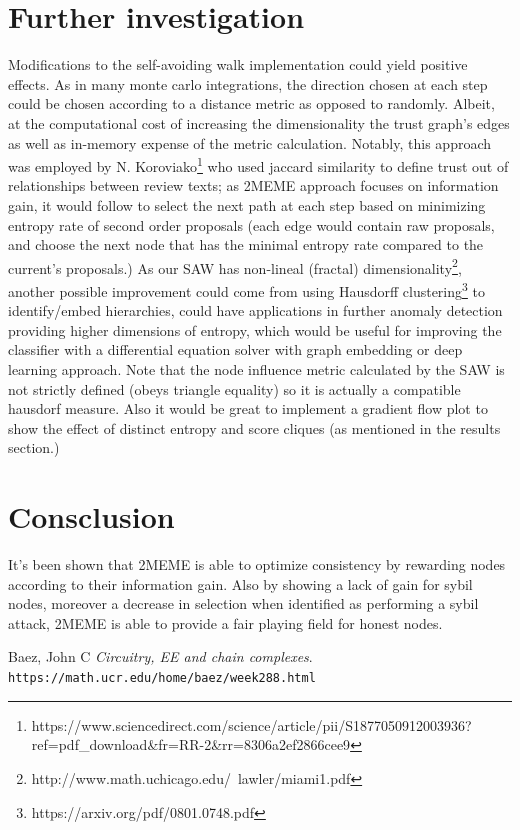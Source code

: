 \documentclass{article}
\begin{document}
\section{Further investigation}
	Modifications to the self-avoiding walk implementation could yield positive effects. As in many monte carlo integrations, the direction chosen at each step could be chosen according to a distance metric as opposed to randomly. Albeit, at the computational cost of increasing the dimensionality the trust graph’s edges as well as in-memory expense of the metric calculation. Notably, this approach was employed by N. Koroviako\footnote{https://www.sciencedirect.com/science/article/pii/S1877050912003936?ref=pdf_download&fr=RR-2&rr=8306a2ef2866cee9} who used jaccard similarity to define trust out of relationships between review texts; as 2MEME approach focuses on information gain, it would follow to select the next path at each step based on minimizing entropy rate of second order proposals (each edge would contain raw proposals, and choose the next node that has the minimal entropy rate compared to the current’s proposals.)
	As our SAW has non-lineal (fractal) dimensionality\footnote{http://www.math.uchicago.edu/~lawler/miami1.pdf}, another possible improvement could come from using Hausdorff clustering\footnote{https://arxiv.org/pdf/0801.0748.pdf} to identify/embed hierarchies, could have applications in further anomaly detection providing higher dimensions of entropy, which would be useful for improving the classifier with a differential equation solver with graph embedding or deep learning approach. Note that the node influence metric calculated by the SAW is not strictly defined (obeys triangle equality) so it is actually a compatible hausdorf measure. 
	Also it would be great to implement a gradient flow plot to show the effect of distinct entropy and score cliques (as mentioned in the results section.)
	
\section{Consclusion}
It's been shown that 2MEME is able to optimize consistency by rewarding nodes according to their information gain. Also by showing a lack of gain for sybil nodes, moreover a decrease in selection when identified as performing a sybil attack, 2MEME is able to provide a fair playing field for honest nodes.
	
	




\begin{thebibliography}{9}
Baez, John C
\textit{Circuitry, EE and chain complexes}.
\\\texttt{https://math.ucr.edu/home/baez/week288.html}

\end{thebibliography}
\end{document}
